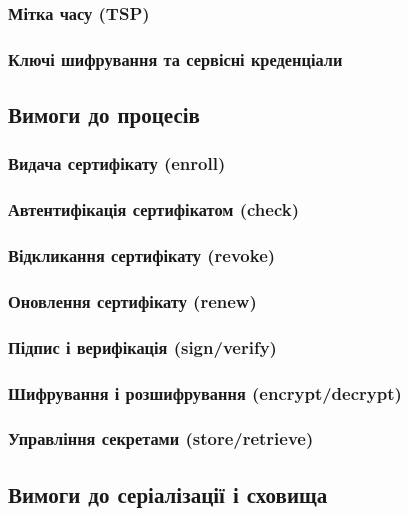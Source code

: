 \subsubsection{Мітка часу (TSP)}

\subsubsection{Ключі шифрування та сервісні креденціали}

\subsection{Вимоги до процесів}

\subsubsection{Видача сертифікату (enroll)}

\subsubsection{Автентифікація сертифікатом (check)}

\subsubsection{Відкликання сертифікату (revoke)}

\subsubsection{Оновлення сертифікату (renew)}

\subsubsection{Підпис і верифікація (sign/verify)}

\subsubsection{Шифрування і розшифрування (encrypt/decrypt)}

\subsubsection{Управління секретами (store/retrieve)}

\subsection{Вимоги до серіалізації і сховища}

